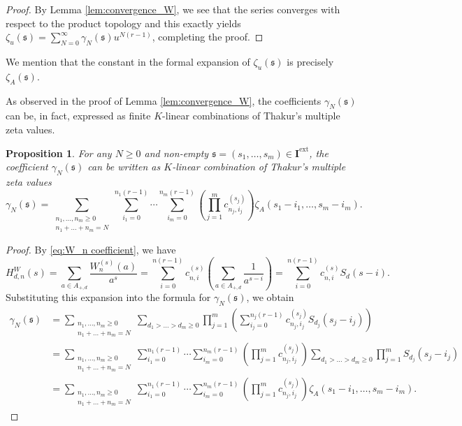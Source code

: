 \documentclass[12pt,reqno]{amsart}
\numberwithin{equation}{section}
\theoremstyle{plain}
\newtheorem{prop}[thm]{Proposition}
\theoremstyle{definition}
\theoremstyle{remark}
\newcommand{\ww}[1]{\mathfrak{#1}}
\newcommand{\Ical}{\mathbf{I}}
\newcommand{\ext}{\mathrm{ext}}
\begin{document}
\begin{proof}
By Lemma \ref{lem:convergence_W}, we see that the series converges with respect to the product topology and this exactly yields $\zeta_u(\ww{s}) = \sum_{N=0}^\infty \gamma_N(\ww{s}) u^{N(r-1)}$, completing the proof.
\end{proof}

We mention that the constant in the formal expansion of $\zeta_u(\ww{s})$ is precisely $\zeta_A(\ww{s})$.

As observed in the proof of Lemma \ref{lem:convergence_W}, the coefficients $\gamma_N(\ww{s})$ can be, in fact, expressed as finite $K$-linear combinations of Thakur's multiple zeta values.

\begin{prop}\label{prop:gamma mzv}
For any $N \ge 0$ and non-empty $\ww{s} = (s_1, \dots, s_m) \in \Ical^{\ext}$, the coefficient $\gamma_N(\ww{s})$ can be written as $K$-linear combination of Thakur's multiple zeta values
$$\gamma_N(\ww{s}) = \sum_{\substack{n_1, \dots, n_m \ge 0 \\ n_1 + \dots + n_m = N}} \sum_{i_1=0}^{n_1(r-1)} \cdots \sum_{i_m=0}^{n_m(r-1)} \left( \prod_{j=1}^m c_{n_j,i_j}^{(s_j)} \right) \zeta_A(s_1-i_1, \dots, s_m-i_m).$$
\end{prop}

\begin{proof}
By \eqref{eq:W_n coefficient}, we have
$$H^W_{d,n}(s) = \sum_{a \in A_{+,d}} \frac{W_n^{(s)}(a)}{a^s} = \sum_{i=0}^{n(r-1)} c_{n,i}^{(s)} \left( \sum_{a \in A_{+,d}} \frac{1}{a^{s-i}} \right) = \sum_{i=0}^{n(r-1)} c_{n,i}^{(s)} S_d(s-i).$$
Substituting this expansion into the formula for $\gamma_N(\ww{s})$, we obtain
\begin{align*}
\gamma_N(\ww{s}) &= \sum_{\substack{n_1, \dots, n_m \ge 0 \\ n_1 + \dots + n_m = N}} \sum_{d_1 > \dots > d_m \ge 0} \prod_{j=1}^m \left( \sum_{i_j=0}^{n_j(r-1)} c_{n_j,i_j}^{(s_j)} S_{d_j}(s_j-i_j) \right) \\
&= \sum_{\substack{n_1, \dots, n_m \ge 0 \\ n_1 + \dots + n_m = N}} \sum_{i_1=0}^{n_1(r-1)} \cdots \sum_{i_m=0}^{n_m(r-1)} \left( \prod_{j=1}^m c_{n_j,i_j}^{(s_j)} \right) \sum_{d_1 > \dots > d_m \ge 0} \prod_{j=1}^m S_{d_j}(s_j-i_j)\\
&=\sum_{\substack{n_1, \dots, n_m \ge 0 \\ n_1 + \dots + n_m = N}} \sum_{i_1=0}^{n_1(r-1)} \cdots \sum_{i_m=0}^{n_m(r-1)} \left( \prod_{j=1}^m c_{n_j,i_j}^{(s_j)} \right) \zeta_A(s_1-i_1, \dots, s_m-i_m).
\end{align*}
\end{proof}
\end{document}

